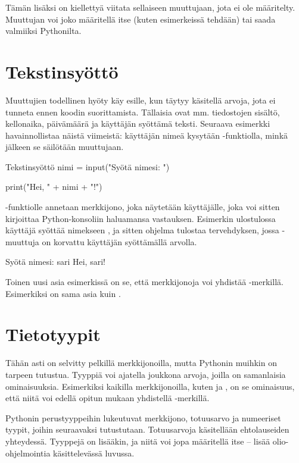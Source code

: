 Tämän lisäksi on kiellettyä viitata sellaiseen muuttujaan, jota ei ole määritelty. Muuttujan voi joko määritellä itse (kuten esimerkeissä tehdään) tai saada valmiiksi Pythonilta.

\section{Tekstinsyöttö}

Muuttujien todellinen hyöty käy esille, kun täytyy käsitellä arvoja, jota ei tunneta ennen koodin suorittamista. Tällaisia ovat mm. tiedostojen sisältö, kellonaika, päivämäärä ja käyttäjän syöttämä teksti. Seuraava esimerkki havainnollistaa näistä viimeistä: käyttäjän nimeä kysytään -funktiolla, minkä jälkeen se säilötään muuttujaan.

\begin{example}{Tekstinsyöttö}
nimi = input("Syötä nimesi: ")

print("Hei, " + nimi + "!")
\end{example}

-funktiolle annetaan merkkijono, joka näytetään käyttäjälle, joka voi sitten kirjoittaa Python-konsoliin haluamansa vastauksen. Esimerkin ulostulossa käyttäjä syöttää nimekseen , ja sitten ohjelma tulostaa tervehdyksen, jossa -muuttuja on korvattu käyttäjän syöttämällä arvolla.

\begin{output}
Syötä nimesi: sari
Hei, sari!
\end{output}

Toinen uusi asia esimerkissä on se, että merkkijonoja voi yhdistää \code{+}-merkillä. Esimerkiksi  on sama asia kuin .

\section{Tietotyypit}

Tähän asti on selvitty pelkillä merkkijonoilla, mutta Pythonin muihkin  on tarpeen tutustua. Tyyppiä voi ajatella joukkona arvoja, joilla on samanlaisia ominaisuuksia. Esimerkiksi kaikilla merkkijonoilla, kuten  ja , on se ominaisuus, että niitä voi edellä opitun mukaan yhdistellä \code{+}-merkillä.

Pythonin perustyyppeihin lukeutuvat merkkijono, totuusarvo ja numeeriset tyypit, joihin seuraavaksi tutustutaan. Totuusarvoja käsitellään ehtolauseiden yhteydessä. Tyyppejä on lisääkin, ja niitä voi jopa määritellä itse – lisää olio-ohjelmointia käsittelevässä luvussa.

